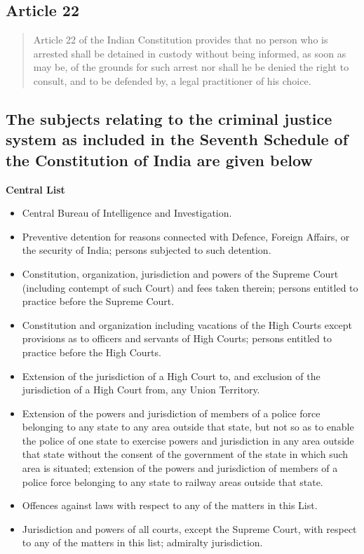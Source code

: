\documentclass[11pt]{article}
\begin{document}
\subsection{Article 22}
\begin{quotation}
	Article 22 of the Indian Constitution provides that no person who is arrested shall be detained in custody without being informed, as soon as may be, of the grounds for such arrest nor shall he be denied the right to consult, and to be defended by, a legal practitioner of his choice.
\end{quotation}

\subsection{The subjects relating to the criminal justice system as included in the Seventh Schedule of the Constitution of India are given below}

\textbf{Central List}
\begin{itemize}
	\item Central Bureau of Intelligence and Investigation.
	\item Preventive detention for reasons connected with Defence, Foreign Affairs, or the security of India; persons subjected to such detention.
	\item Constitution, organization, jurisdiction and powers of the Supreme Court (including contempt of such Court) and fees taken therein; persons entitled to practice before the Supreme Court.
	\item Constitution and organization including vacations of the High Courts except provisions as to officers and servants of High Courts; persons entitled to practice before the High Courts.
	\item Extension of the jurisdiction of a High Court to, and exclusion of the jurisdiction of a High Court from, any Union Territory.
	\item Extension of the powers and jurisdiction of members of a police force belonging to any state to any area outside that state, but not so as to enable the police of one state to exercise powers and jurisdiction in any area outside that state without the consent of the government of the state in which such area is situated; extension of the powers and jurisdiction of members of a police force belonging to any state to railway areas outside that state.
	\item Offences against laws with respect to any of the matters in this List.
	\item Jurisdiction and powers of all courts, except the Supreme Court, with respect to any of the matters in this list; admiralty jurisdiction.

\end{itemize}
\end{document}
